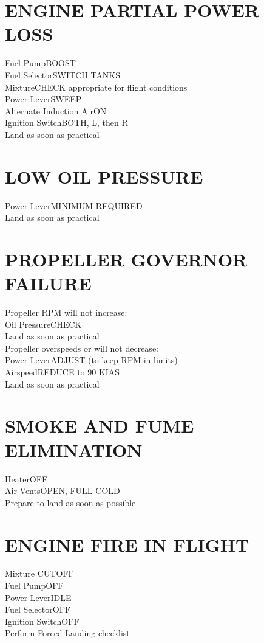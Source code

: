 \documentclass{article}
\begin{document}
\begin{multicols*}{2}
\section*{ENGINE PARTIAL POWER LOSS}
Fuel Pump\dotfill BOOST\\
Fuel Selector\dotfill SWITCH TANKS\\
Mixture\dotfill CHECK appropriate for flight conditions\\
Power Lever\dotfill SWEEP\\
Alternate Induction Air\dotfill ON\\
Ignition Switch\dotfill BOTH, L, then R\\
Land as soon as practical
\section*{LOW OIL PRESSURE}
Power Lever\dotfill MINIMUM REQUIRED\\
Land as soon as practical
\section*{PROPELLER GOVERNOR FAILURE}
Propeller RPM will not increase:\\
\hspace*{6mm} Oil Pressure\dotfill CHECK\\
\hspace*{6mm} Land as soon as practical\\
Propeller overspeeds or will not decrease:\\
\hspace*{6mm} Power Lever\dotfill ADJUST (to keep RPM in limits)\\
\hspace*{6mm} Airspeed\dotfill REDUCE to 90 KIAS\\
\hspace*{6mm} Land as soon as practical
\section*{SMOKE AND FUME ELIMINATION}
Heater\dotfill OFF\\
Air Vents\dotfill OPEN, FULL COLD\\
Prepare to land as soon as possible
\section*{ENGINE FIRE IN FLIGHT}
Mixture \dotfill CUTOFF\\
Fuel Pump\dotfill OFF\\
Power Lever\dotfill IDLE\\
Fuel Selector\dotfill OFF\\
Ignition Switch\dotfill OFF\\
Perform Forced Landing checklist

\end{multicols*}
\end{document}
